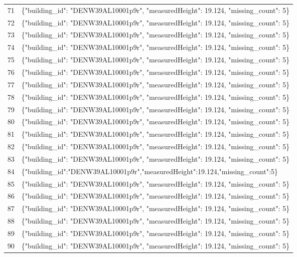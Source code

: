 \documentclass[a4paper,11pt]{article}
\begin{document}
\begin{table}[ht]
\begin{tabular}{r p{12cm}}
71 & \{"building\_id": "DENW39AL10001p9r", "measuredHeight": 19.124, "missing\_count": 5\} \\
72 & \{"building\_id": "DENW39AL10001p9r", "measuredHeight": 19.124, "missing\_count": 5\} \\
73 & \{"building\_id": "DENW39AL10001p9r", "measuredHeight": 19.124, "missing\_count": 5\} \\
74 & \{"building\_id": "DENW39AL10001p9r", "measuredHeight": 19.124, "missing\_count": 5\} \\
75 & \{"building\_id": "DENW39AL10001p9r", "measuredHeight": 19.124, "missing\_count": 5\} \\
76 & \{"building\_id": "DENW39AL10001p9r", "measuredHeight": 19.124, "missing\_count": 5\} \\
77 & \{"building\_id": "DENW39AL10001p9r", "measuredHeight": 19.124, "missing\_count": 5\} \\
78 & \{"building\_id": "DENW39AL10001p9r", "measuredHeight": 19.124, "missing\_count": 5\} \\
79 & \{"building\_id": "DENW39AL10001p9r", "measuredHeight": 19.124, "missing\_count": 5\} \\
80 & \{"building\_id": "DENW39AL10001p9r", "measuredHeight": 19.124, "missing\_count": 5\} \\
81 & \{"building\_id": "DENW39AL10001p9r", "measuredHeight": 19.124, "missing\_count": 5\} \\
82 & \{"building\_id": "DENW39AL10001p9r", "measuredHeight": 19.124, "missing\_count": 5\} \\
83 & \{"building\_id": "DENW39AL10001p9r", "measuredHeight": 19.124, "missing\_count": 5\} \\
84 & \{"building\_id":"DENW39AL10001p9r","measuredHeight":19.124,"missing\_count":5\} \\
85 & \{"building\_id": "DENW39AL10001p9r", "measuredHeight": 19.124, "missing\_count": 5\} \\
86 & \{"building\_id": "DENW39AL10001p9r", "measuredHeight": 19.124, "missing\_count": 5\} \\
87 & \{"building\_id": "DENW39AL10001p9r", "measuredHeight": 19.124, "missing\_count": 5\} \\
88 & \{"building\_id": "DENW39AL10001p9r", "measuredHeight": 19.124, "missing\_count": 5\} \\
89 & \{"building\_id": "DENW39AL10001p9r", "measuredHeight": 19.124, "missing\_count": 5\} \\
90 & \{"building\_id": "DENW39AL10001p9r", "measuredHeight": 19.124, "missing\_count": 5\} \\

\end{tabular}
\end{table}
\end{document}
